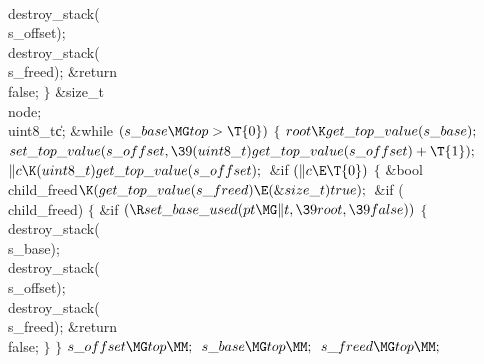 \\{destroy\_stack}(\\{s\_offset});\6
\\{destroy\_stack}(\\{s\_freed});\6
\&{return} \\{false};\6
\4${}\}{}$\2\7
\&{size\_t} \\{node};\7
\\{uint8\_t}\|c;\6
\&{while} ${}(\\{s\_base}\MG\\{top}>\T{0}){}$\5
${}\{{}$\1\6
${}\\{root}\K\\{get\_top\_value}(\\{s\_base});{}$\6
${}\\{set\_top\_value}(\\{s\_offset},\39(\\{uint8\_t})\\{get\_top\_value}(\\{s%
\_offset})+\T{1});{}$\6
${}\|c\K(\\{uint8\_t})\\{get\_top\_value}(\\{s\_offset});{}$\6
\&{if} ${}(\|c\E\T{0}){}$\5
${}\{{}$\1\6
\&{bool} \\{child\_freed}${}\K(\\{get\_top\_value}(\\{s\_freed})\E(\&{size\_t})%
\,\\{true});{}$\7
\&{if} (\\{child\_freed})\5
${}\{{}$\1\6
\&{if} ${}(\R\\{set\_base\_used}(\\{pt}\MG\|t,\39\\{root},\39\\{false})){}$\5
${}\{{}$\1\6
\\{destroy\_stack}(\\{s\_base});\6
\\{destroy\_stack}(\\{s\_offset});\6
\\{destroy\_stack}(\\{s\_freed});\6
\&{return} \\{false};\6
\4${}\}{}$\2\6
\4${}\}{}$\2\6
${}\\{s\_offset}\MG\\{top}\MM;{}$\6
${}\\{s\_base}\MG\\{top}\MM;{}$\6
${}\\{s\_freed}\MG\\{top}\MM;{}$\6
